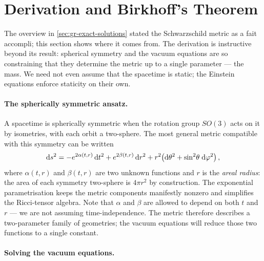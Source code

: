 \section{Derivation and Birkhoff's Theorem}
\label{sec:schw-derivation}

The overview in \cref{sec:gr-exact-solutions} stated the Schwarzschild
metric as a fait accompli; this section shows where it comes from.  The
derivation is instructive beyond its result: spherical symmetry and the
vacuum equations are so constraining that they determine the metric up
to a single parameter --- the mass.  We need not even assume that the
spacetime is static; the Einstein equations enforce staticity on their
own.

\paragraph{The spherically symmetric ansatz.}

A spacetime is spherically symmetric when the rotation group $SO(3)$
acts on it by isometries, with each orbit a two-sphere.  The most
general metric compatible with this symmetry can be written
\cite{Carroll2004}
%
\begin{equation}
  \mathrm{d} s^2 = -e^{2\alpha(t,r)}\,\mathrm{d} t^2
           + e^{2\beta(t,r)}\,\mathrm{d} r^2
           + r^2\!\left(\mathrm{d}\theta^2
             + \sin^2\!\theta\;\mathrm{d}\varphi^2\right) ,
  \label{eq:schw-ansatz}
\end{equation}
%
where $\alpha(t,r)$ and $\beta(t,r)$ are two unknown functions and $r$
is the \emph{areal radius}: the area of each symmetry two-sphere is
$4\pi r^2$ by construction.
The exponential parametrisation keeps the metric components manifestly
nonzero and simplifies the Ricci-tensor algebra.  Note that $\alpha$
and $\beta$ are allowed to depend on both $t$ and $r$ --- we are not
assuming time-independence.  The metric therefore describes a
two-parameter family of geometries; the vacuum equations will reduce
those two functions to a single constant.

\paragraph{Solving the vacuum equations.}

